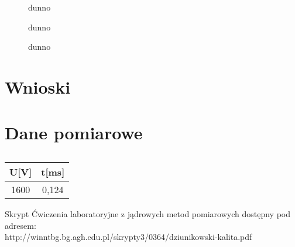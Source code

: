 \documentclass[11pt,a4paper]{article}
\begin{document}
\begin{figure}[H]
\centering
\resizebox{.8\linewidth}{!}{}
\caption{dunno}
\label{fig1}
\end{figure}

\begin{figure}[H]
\centering
\resizebox{.8\linewidth}{!}{}
\caption{dunno}
\label{fig1}
\end{figure}

\begin{figure}[H]
\centering
\resizebox{.8\linewidth}{!}{}
\caption{dunno}
\label{fig1}
\end{figure}

\section{Wnioski}

\section{Dane pomiarowe}

\begin{longtable}{cc}
	\caption{\color{red}{????????}}\\
\label{dt2}
U[V]	&	t[ms] \\ \hline
\endhead
1600	&0,124 \\
\end{longtable}

\begin{thebibliography}{9}
Skrypt Ćwiczenia laboratoryjne z jądrowych metod pomiarowych dostępny pod adresem:\\http://winntbg.bg.agh.edu.pl/skrypty3/0364/dziunikowski-kalita.pdf 
\end{thebibliography}
\end{document}
